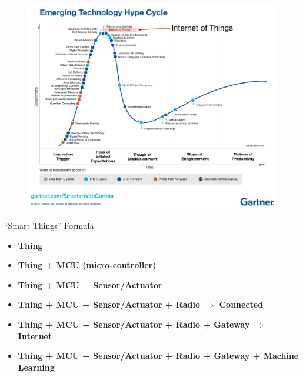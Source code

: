 \begin{frame}
  \begin{figure}
    \includegraphics[width=\textwidth]{figures/hype.png}
  \end{figure}
\end{frame}

\begin{frame}{``Smart Things'' Formula}

  \begin{itemize}
  \item<1-> \textbf<1>{Thing}
  \item<2-> \textbf<2>{Thing + MCU (micro-controller)}
  \item<3-> \textbf<3>{Thing + MCU + Sensor/Actuator}
  \item<4-> \textbf<4>{Thing + MCU + Sensor/Actuator + Radio $\Rightarrow$ Connected}
  \item<5-> \textbf<5>{Thing + MCU + Sensor/Actuator + Radio + Gateway $\Rightarrow$ Internet}
  \item<5-> \textbf<6>{Thing + MCU + Sensor/Actuator + Radio + Gateway + Machine Learning}
  \end{itemize}

\end{frame}


